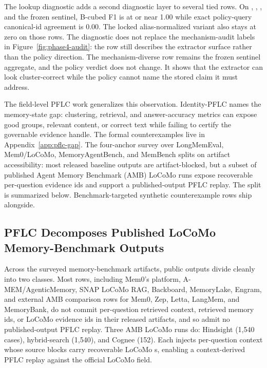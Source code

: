 The lookup diagnostic adds a second diagnostic layer to several tied rows. On
,
,
, and the frozen sentinel, B-cubed
F1 is at or near 1.00 while exact
policy-query canonical-id agreement is 0.00. The locked alias-normalized
variant also stays at zero on those rows. The diagnostic does not replace the
mechanism-audit labels in Figure~\ref{fig:phase4-audit}: the
 row still describes the extractor
surface rather than the policy direction. The mechanism-diverse row remains
the frozen sentinel aggregate, and the policy verdict does not change. It shows
that the extractor can look cluster-correct while the policy cannot name the
stored claim it must address.

The field-level PFLC work generalizes this observation. Identity-PFLC names the
memory-state gap: clustering, retrieval, and answer-accuracy metrics can expose
good groups, relevant content, or correct text while failing to certify the
governable evidence handle. The formal counterexamples live in
Appendix~\ref{app:pflc-gap}. The four-anchor survey over LongMemEval,
Mem0/LoCoMo, MemoryAgentBench, and MemBench splits on artifact accessibility:
most released baseline outputs are artifact-blocked, but a subset of published
Agent Memory Benchmark (AMB) LoCoMo runs expose recoverable per-question
evidence ids and support a published-output PFLC replay. The split is
summarized below. Benchmark-targeted synthetic counterexample rows ship
alongside.

\subsection{PFLC Decomposes Published LoCoMo Memory-Benchmark Outputs}
\label{sec:amb-replay}

Across the surveyed memory-benchmark artifacts, public outputs divide cleanly
into two classes. Most rows, including Mem0's  platform,
A-MEM/AgenticMemory, SNAP LoCoMo RAG, Backboard, MemoryLake, Engram, and
external AMB comparison rows for Mem0, Zep, Letta, LangMem, and MemoryBank, do
not commit per-question retrieved context, retrieved memory ids, or LoCoMo
evidence ids in their released artifacts, and so admit no published-output
PFLC replay. Three AMB LoCoMo runs do: Hindsight (1{,}540 cases),
hybrid-search (1{,}540), and Cognee (152). Each injects per-question context
whose source blocks carry recoverable LoCoMo s, enabling a
context-derived PFLC replay against the official LoCoMo 
field.


